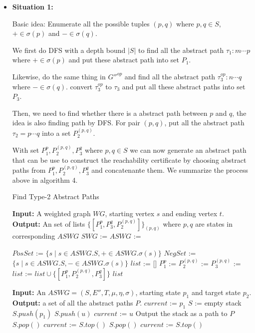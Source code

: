 \documentclass{article}
\begin{document}
\begin{itemize}
\item \textbf{Situation 1:}

Basic idea: Enumerate all the possible tuples $(p, q)$ where $p, q\in S$, $+ \in \sigma(p) $ and $- \in \sigma(q)$.

We first do DFS with a depth bound $|S|$ to find all the abstract path $\tau_1: m\cdots p$ where $+ \in \sigma(p)$ and put these abstract path into set $P_1$.

Likewise, do the same thing in $G''^{op}$ and find all the abstract path $\tau^{op}_3: n\cdots q$ where $-\in \sigma(q)$. convert $\tau^{op}_3$ to $\tau_3$ and put all these abstract paths into set $P_3$.

Then,  we need to find whether there is a abstract path between $p$ and $q$, the idea is also finding path by DFS. For  pair $(p,q)$, put all the abstract path $\tau_2 = p\cdots q$ into a set $P^{(p,q)}_2$.

With set $P_1^p, P^{(p,q)}_2, P_3^q$ where $p,q\in S$ we can now generate an abstract path that can be use to construct the reachability certificate by choosing abstract paths from $P_1^p, P_2^{(p,q)}, P_3^q$ and concatenante them. We summarize the process above in algorithm 4.

\begin{algorithm}
	\caption{Find Type-2 Abstract Paths}
	\begin{algorithmic}
		\State {}
		\State\textbf{Input:} A weighted graph $WG$, starting vertex $s$ and ending vertex $t$.
		\State\textbf{Output:} An set of lists $\{[P_1^p, P_3^q, P_2^{(p,q)}]\}_{(p,q)}$ where $p,q$ are states in corresponding $ASWG$
		\State $SWG$ := 
		\State $ASWG$ := 
		
		\State $PosSet$ := $\{s\mid s\in ASWG.S, +\in ASWG.\sigma(s)\}$
		\State $NegSet$ := $\{s\mid s\in ASWG.S, -\in ASWG.\sigma(s)\}$
		\State $list$ := []
			\State $P_1^p$ := 
				\State $P_2^{(p,q)}$ := 
				\State $P_3^{(p,q)}$ := 
				\State $list$ := $list \cup \{[P_1^p, P_2^{(p,q)}, P_3^q]\}$
			\EndFor
		\EndFor
		\State \Return $list$
		\EndFunction
		
		
		\State {}
			\State \textbf{Input: }An $ASWG = (S,E'',T,\mu,\eta,\sigma)$, starting state $p_1$ and target state $p_2$.
			\State \textbf{Output: }a set of all the abstract paths $P$.
			\State $current$ := $p_1$
			\State $S$ := empty stack
			\State $S.push(p_1)$
				\State $S.push(u)$
				\State $current$ := $u$
					\State Output the stack as a path to $P$
					\State $S.pop()$
					\State $current$ := $S.top()$
				\EndIf				
					\State $S.pop()$
					\State $current$ := $S.top()$
				\EndIf
			\EndWhile
		\EndFunction
	\end{algorithmic}
\end{algorithm}


\end{itemize}
\end{document}

